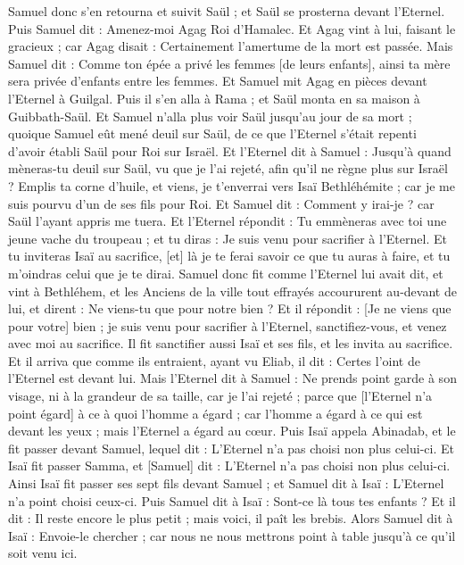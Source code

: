 \begin{multicols}{2}
Samuel donc s'en retourna et suivit Saül ; et Saül se prosterna devant l'Eternel.
Puis Samuel dit : Amenez-moi Agag Roi d'Hamalec. Et Agag vint à lui, faisant le gracieux ; car Agag disait : Certainement l'amertume de la mort est passée.
Mais Samuel dit : Comme ton épée a privé les femmes [de leurs enfants], ainsi ta mère sera privée d'enfants entre les femmes. Et Samuel mit Agag en pièces devant l'Eternel à Guilgal.
Puis il s'en alla à Rama ; et Saül monta en sa maison à Guibbath-Saül.
Et Samuel n'alla plus voir Saül jusqu'au jour de sa mort ; quoique Samuel eût mené deuil sur Saül, de ce que l'Eternel s'était repenti d'avoir établi Saül pour Roi sur Israël.
\VerseOne{}Et l'Eternel dit à Samuel : Jusqu'à quand mèneras-tu deuil sur Saül, vu que je l'ai rejeté, afin qu'il ne règne plus sur Israël ? Emplis ta corne d'huile, et viens, je t'enverrai vers Isaï Bethléhémite ; car je me suis pourvu d'un de ses fils pour Roi.
Et Samuel dit : Comment y irai-je ? car Saül l'ayant appris me tuera. Et l'Eternel répondit : Tu emmèneras avec toi une jeune vache du troupeau ; et tu diras : Je suis venu pour sacrifier à l'Eternel.
Et tu inviteras Isaï au sacrifice, [et] là je te ferai savoir ce que tu auras à faire, et tu m'oindras celui que je te dirai.
Samuel donc fit comme l'Eternel lui avait dit, et vint à Bethléhem, et les Anciens de la ville tout effrayés accoururent au-devant de lui, et dirent : Ne viens-tu que pour notre bien ?
Et il répondit : [Je ne viens que pour votre] bien ; je suis venu pour sacrifier à l'Eternel, sanctifiez-vous, et venez avec moi au sacrifice. Il fit sanctifier aussi Isaï et ses fils, et les invita au sacrifice.
Et il arriva que comme ils entraient, ayant vu Eliab, il dit : Certes l'oint de l'Eternel est devant lui.
Mais l'Eternel dit à Samuel : Ne prends point garde à son visage, ni à la grandeur de sa taille, car je l'ai rejeté ; parce que [l'Eternel n'a point égard] à ce à quoi l'homme a égard ; car l'homme a égard à ce qui est devant les yeux ; mais l'Eternel a égard au cœur.
Puis Isaï appela Abinadab, et le fit passer devant Samuel, lequel dit : L'Eternel n'a pas choisi non plus celui-ci.
Et Isaï fit passer Samma, et [Samuel] dit : L'Eternel n'a pas choisi non plus celui-ci.
Ainsi Isaï fit passer ses sept fils devant Samuel ; et Samuel dit à Isaï : L'Eternel n'a point choisi ceux-ci.
Puis Samuel dit à Isaï : Sont-ce là tous tes enfants ? Et il dit : Il reste encore le plus petit ; mais voici, il paît les brebis. Alors Samuel dit à Isaï : Envoie-le chercher ; car nous ne nous mettrons point à table jusqu'à ce qu'il soit venu ici.

\end{multicols}
